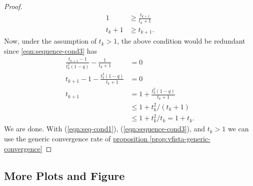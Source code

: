 \begin{proof}
\begin{align*}
            1 &\ge 
            \frac{t_{k + 1}}{t_k + 1}
            \\
            t_k + 1 &\ge t_{k + 1}. 
        \end{align*}
        Now, under the assumption of $t_k > 1$, the above condition would be redundant since \ref*{eqn:sequence-cond3} has 
        \begin{align*}
            \frac{t_{k + 1} - 1}{t_k^2(1 - q)}
            -
            \frac{1}{t_k + 1} &= 0
            \\
            t_{k + 1} - 1 - 
            \frac{t_k^2(1 - q)}{t_k + 1} &= 0
            \\
            t_{k + 1} &= 1 + 
            \frac{t_k^2(1 - q)}{t_k + 1}
            \\
            & \le 1 + t_k^2/(t_k + 1)
            \\
            &\le 1 + t_k^2/t_k = 1 + t_k. 
        \end{align*}
        We are done. 
        With (\ref*{eqn:seq-cond1}), (\ref*{eqn:sequence-cond3}), and $t_k > 1$ we can use the generic convergence rate of \hyperref[prop:vfista-generic-convergence]{proposition \ref*{prop:vfista-generic-convergence}}
    \end{proof}
    

\subsection{More Plots and Figure}


